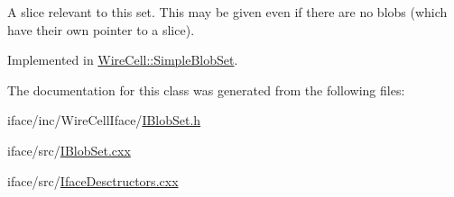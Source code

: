 A slice relevant to this set. This may be given even if there are no blobs (which have their own pointer to a slice). 

Implemented in \hyperlink{class_wire_cell_1_1_simple_blob_set_a72e71d9df512fe2efe1d3e8c5a1f7087}{Wire\+Cell\+::\+Simple\+Blob\+Set}.



The documentation for this class was generated from the following files\+:\begin{DoxyCompactItemize}
\item 
iface/inc/\+Wire\+Cell\+Iface/\hyperlink{_i_blob_set_8h}{I\+Blob\+Set.\+h}\item 
iface/src/\hyperlink{_i_blob_set_8cxx}{I\+Blob\+Set.\+cxx}\item 
iface/src/\hyperlink{_iface_desctructors_8cxx}{Iface\+Desctructors.\+cxx}\end{DoxyCompactItemize}
